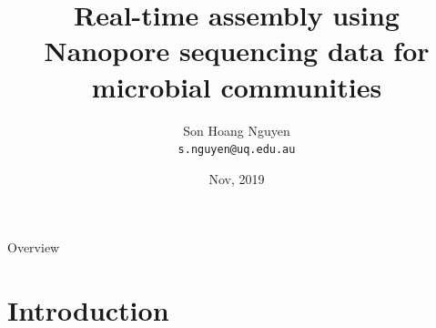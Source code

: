 \documentclass{beamer}
\title[Real-time assembly \& analysis for microbial genomes]
{
Real-time assembly using Nanopore sequencing data for microbial communities
}
\author[Son Hoang Nguyen, The University of Queensland]{Son Hoang Nguyen \\ \footnotesize{\texttt{s.nguyen@uq.edu.au}}
}
\date{Nov, 2019}
\institute[IMB,UQ]{\large{Institute for Molecular Bioscience \\ The University of Queensland}}
\begin{document}
\begin{frame}
   \titlepage
\end{frame}
\begin{frame}{Overview}
 \tableofcontents
\end{frame}
\section{Introduction}
\end{document}
